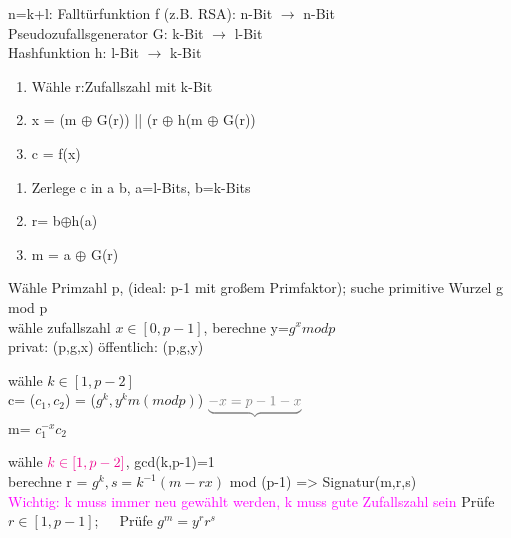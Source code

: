 
n=k+l:
Falltürfunktion f (z.B. RSA): n-Bit $\to$ n-Bit\\
Pseudozufallsgenerator G: k-Bit $\to$ l-Bit\\
Hashfunktion h: l-Bit $\to$ k-Bit
\begin{multicols}{2}
\begin{enumerate}
	\item Wähle r:Zufallszahl mit k-Bit
	\item x = (m $\oplus$ G(r)) || (r $\oplus$ h(m $\oplus$ G(r))
	\item c = f(x)
\end{enumerate}
\begin{enumerate}
	\item Zerlege c in a b,  a=l-Bits, b=k-Bits
	\item r= b$\oplus$h(a)
	\item m = a $\oplus$ G(r)
\end{enumerate}%
\end{multicols}%
Wähle Primzahl p, (ideal: p-1 mit großem Primfaktor); suche primitive Wurzel g mod p\\
wähle zufallszahl $x \in [0,p-1]$, berechne y=$g^x mod p$\\
privat: (p,g,x) öffentlich: (p,g,y)

\begin{multicols}{2}
wähle $k \in [1,p-2]$ \\
 c= ($c_1,c_2$) = ($g^k, y^km(modp)$)
$\textcolor{gray}{\underbrace{-x= p-1-x}}$\\
m= $c_1^{-x}c_2$
\end{multicols}

\begin{multicols}{2}
wähle $\textcolor{magenta}{k \in [1,p-2]}$, gcd(k,p-1)=1\\
berechne r = $g^k, s=k^{-1}(m-rx)$ mod (p-1) => Signatur(m,r,s)\\
\textcolor{magenta}{Wichtig: k muss immer neu gewählt werden, k muss gute Zufallszahl sein}
Prüfe $r \in [1,p-1]$;~~~Prüfe $g^m = y^rr^s$
\end{multicols}

